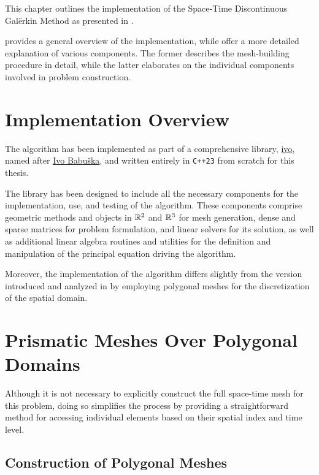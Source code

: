 This chapter outlines the implementation of the Space-Time Discontinuous Galërkin Method as presented in .

 provides a general overview of the implementation, while  offer a more detailed explanation of various components. The former describes the mesh-building procedure in detail, while the latter elaborates on the individual components involved in problem construction.

\newpage
\section{Implementation Overview} \label{sec:overview}

The algorithm has been implemented as part of a comprehensive library, \href{https://github.com/diantonioandrea/ivo}{ivo}, named after \href{https://en.wikipedia.org/wiki/Ivo_Babuška}{Ivo Babuška}, and written entirely in \lstinline{C++23} from scratch for this thesis.

The library has been designed to include all the necessary components for the implementation, use, and testing of the algorithm. These components comprise geometric methods and objects in $\mathbb{R}^{2}$ and $\mathbb{R}^{3}$ for mesh generation, dense and sparse matrices for problem formulation, and linear solvers for its solution, as well as additional linear algebra routines and utilities for the definition and manipulation of the principal equation driving the algorithm.

Moreover, the implementation of the algorithm differs slightly from the version introduced and analyzed in  by employing polygonal meshes for the discretization of the spatial domain.

\newpage
\section{Prismatic Meshes Over Polygonal Domains} \label{section:mesh}

Although it is not necessary to explicitly construct the full space-time mesh for this problem, doing so simplifies the process by providing a straightforward method for accessing individual elements based on their spatial index and time level. 

\subsection{Construction of Polygonal Meshes} \label{subsection:pol_mesh}

